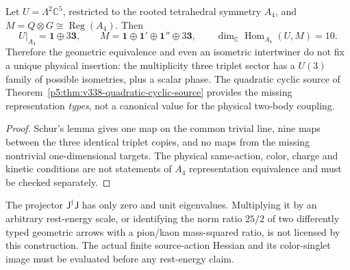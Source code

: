 \documentclass[12pt,a4paper]{article}
\begin{document}
\begin{proposition}
\label{p5c:prop:v338-intertwiner-ambiguity}
Let $U=\Lambda^2\mathbb C^5$, restricted to the rooted tetrahedral
symmetry $A_4$, and $M=Q\otimes G\cong\operatorname{Reg}(A_4)$.
Then
\[
 U|_{A_4}=\mathbf1\oplus3\mathbf3,\qquad
 M=\mathbf1\oplus\mathbf1'\oplus\mathbf1''\oplus3\mathbf3,
 \qquad \dim_{\mathbb C}\operatorname{Hom}_{A_4}(U,M)=10.
\]
Therefore the geometric equivalence and even an isometric
intertwiner do not fix a unique physical insertion: the multiplicity
three triplet sector has a $U(3)$ family of possible isometries,
plus a scalar phase.  The quadratic cyclic source of
Theorem~\ref{p5:thm:v338-quadratic-cyclic-source} provides the
missing representation \emph{types}, not a canonical value for the
physical two-body coupling.
\end{proposition}
\begin{proof}
Schur's lemma gives one map on the common trivial line, nine maps
between the three identical triplet copies, and no maps from the
missing nontrivial one-dimensional targets.  The physical same-action,
color, charge and kinetic conditions are not statements of $A_4$
representation equivalence and must be checked separately.
\end{proof}
\begin{remark}
The projector $\mathsf J^\dagger\mathsf J$ has only zero and unit
eigenvalues.  Multiplying it by an arbitrary rest-energy scale, or
identifying the norm ratio $25/2$ of two differently typed geometric
arrows with a pion/kaon mass-squared ratio, is not licensed by this
construction.  The actual finite source-action Hessian and its
color-singlet image must be evaluated before any rest-energy claim.
\end{remark}


\clearpage
\end{document}
